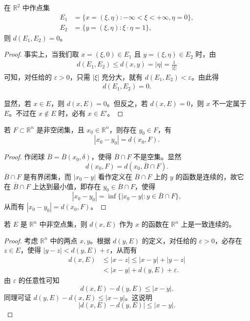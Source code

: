 \documentclass[../../main.tex]{subfiles}
\begin{document}
\begin{example}
在 \(\mathbb{R}^2\) 中作点集
\begin{align*}
E_1 &= \{x = (\xi,\eta): -\infty < \xi < +\infty, \eta = 0\},\\
E_2 &= \{y = (\xi,\eta): \xi\cdot\eta = 1\},
\end{align*}
则 \(d(E_1,E_2) = 0\)。
\end{example}
\begin{proof}
事实上，当我们取 \(x = (\xi,0)\in E_1\) 且 \(y = (\xi,\eta)\in E_2\) 时，由
\begin{align*}
d(E_1,E_2) \leqslant d(x,y) = |\eta| = \frac{1}{|\xi|}
\end{align*}
可知，对任给的 \(\varepsilon > 0\)，只需 \(|\xi|\) 充分大，就有 \(d(E_1,E_2) < \varepsilon\)。由此得
\begin{align*}
d(E_1,E_2) = 0.
\end{align*}

显然，若 \(x\in E\)，则 \(d(x,E) = 0\)。但反之，若 \(d(x,E) = 0\)，则 \(x\) 不一定属于 \(E\)。不过在 \(x\notin E\) 时，必有 \(x\in E'\)。 
\end{proof}

\begin{theorem}
若 \(F\subset\mathbb{R}^n\) 是非空闭集，且 \(x_0\in\mathbb{R}^n\)，则存在 \(y_0\in F\)，有
\[
|x_0 - y_0| = d(x_0,F).
\]
\end{theorem}
\begin{proof}
作闭球 \(\overline{B}=\overline{B}(x_0,\delta)\)，使得 \(\overline{B}\cap F\) 不是空集。显然
\[
d(x_0,F)=d(x_0,\overline{B}\cap F).
\]
\(\overline{B}\cap F\) 是有界闭集，而 \(|x_0 - y|\) 看作定义在 \(\overline{B}\cap F\) 上的 \(y\) 的函数是连续的，故它在 \(\overline{B}\cap F\) 上达到最小值，即存在 \(y_0\in\overline{B}\cap F\)，使得
\[
|x_0 - y_0| = \inf\{|x_0 - y|: y\in\overline{B}\cap F\},
\]
从而有 \(|x_0 - y_0| = d(x_0,F)\)。
\end{proof}

\begin{theorem}
若 \(E\) 是 \(\mathbb{R}^n\) 中非空点集，则 \(d(x,E)\) 作为 \(x\) 的函数在 \(\mathbb{R}^n\) 上是一致连续的。
\end{theorem}
\begin{proof}
考虑 \(\mathbb{R}^n\) 中的两点 \(x,y\)。根据 \(d(y,E)\) 的定义，对任给的 \(\varepsilon>0\)，必存在 \(z\in E\)，使得 \(|y - z|<d(y,E)+\varepsilon\)，从而有
\begin{align*}
d(x,E)&\leqslant|x - z|\leqslant|x - y|+|y - z|\\
&<|x - y|+d(y,E)+\varepsilon.
\end{align*}
由 \(\varepsilon\) 的任意性可知
\[
d(x,E)-d(y,E)\leqslant|x - y|.
\]
同理可证 \(d(y,E)-d(x,E)\leqslant|x - y|\)。这说明
\[
|d(x,E)-d(y,E)|\leqslant|x - y|.
\]
\end{proof}
\end{document}
